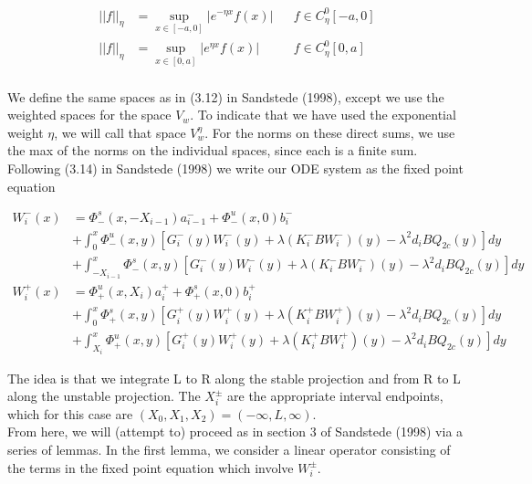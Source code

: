 \documentclass[12pt]{article}
\begin{document}
\begin{align*}
|| f ||_\eta &= \sup_{x \in [-a, 0]} |e^{-\eta x} f(x) | && f \in C^0_\eta[-a, 0] \\
|| f ||_\eta &= \sup_{x \in [0, a]} |e^{\eta x} f(x) | && f \in C^0_\eta[0, a] \\
\end{align*}

We define the same spaces as in (3.12) in Sandstede (1998), except we use the weighted spaces for the space $V_w$. To indicate that we have used the exponential weight $\eta$, we will call that space $V_w^\eta$. For the norms on these direct sums, we use the max of the norms on the individual spaces, since each is a finite sum.\\

Following (3.14) in Sandstede (1998) we write our ODE system as the fixed point equation

\begin{align*}
W_i^-(x) &= \Phi^s_-(x, -X_{i-1})a^-_{i-1} + \Phi^u_-(x, 0)b_i^- \\
&+ \int_0^x \Phi^u_-(x, y)[G_i^-(y) W_i^-(y) + \lambda (K_i^- B W_i^-)(y) - \lambda^2 d_i B Q_{2c}(y) ] dy \\
&+ \int_{-X_{i-1}}^x \Phi^s_-(x, y)[G_i^-(y) W_i^-(y) + \lambda (K_i^-B W_i^-)(y) - \lambda^2 d_i B Q_{2c}(y) ] dy \\
W_i^+(x) &= \Phi^u_+(x, X_i)a^+_{i} + \Phi^s_+(x, 0)b_i^+ \\
&+ \int_0^x \Phi^s_+(x, y)[G_i^+(y) W_i^+(y) + \lambda (K_i^+ B W_i^+)(y) - \lambda^2 d_i B Q_{2c}(y) ] dy \\
&+ \int_{X_{i}}^x \Phi^u_+(x, y)[G_i^+(y) W_i^+(y) + \lambda (K_i^+ B W_i^+)(y) - \lambda^2 d_i B Q_{2c}(y) ] dy
\end{align*}

The idea is that we integrate L to R along the stable projection and from R to L along the unstable projection. The $X_i^\pm$ are the appropriate interval endpoints, which for this case are $(X_0, X_1, X_2) = (-\infty, L, \infty)$.\\

From here, we will (attempt to) proceed as in section 3 of Sandstede (1998) via a series of lemmas. In the first lemma, we consider a linear operator consisting of the terms in the fixed point equation which involve $W_i^\pm$. 
\end{document}
